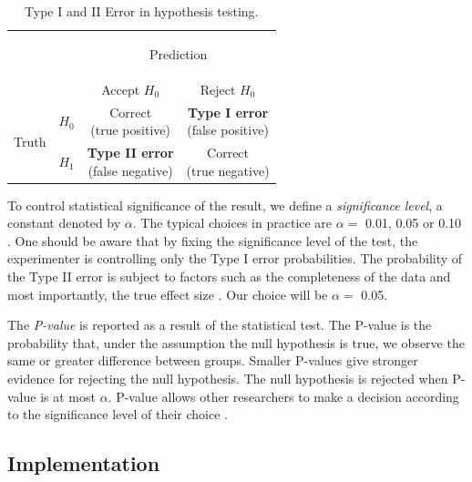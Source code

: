 \begin{table}[!htbp]
\centering
\renewcommand{\arraystretch}{2.5}
\begin{tabular}{l|l|c|c|}
\multicolumn{2}{c}{}&\multicolumn{2}{c}{\begin{large}Prediction \end{large}}\\
\cline{3-4}
\multicolumn{2}{c|}{}&Accept $H_{0}$&Reject $H_{0}$\\
\cline{2-4}
\multirow{2}{*}{\begin{large}Truth\end{large}}& \textbf{$H_{0}$} & \shortstack{Correct\\(true positive)} & \shortstack{\textbf{Type I error}\\(false positive)}\\
\cline{2-4}
& \textbf{$H_{1}$} & \shortstack{\textbf{Type II error}\\(false negative)} & \shortstack{Correct\\(true negative)} \\
\cline{2-4}
\end{tabular}
\caption{Type I and II Error in hypothesis testing.}
\label{tab:hypothesis_testing_errors}
\end{table}

To control statistical significance of the result, we define a \textit{significance level}, a constant denoted by $\alpha$. The typical choices in practice are $\alpha =$ 0.01, 0.05 or 0.10 \cite{casella}. One should be aware that by fixing the significance level of the test, the experimenter is controlling only the Type I error probabilities. The probability of the Type II error is subject to factors such as the completeness of the data and most importantly, the true effect size \cite{sham_purcell}. Our choice will be $\alpha =$ 0.05.

The \textit{P-value} is reported as a result of the statistical test. The P-value is the probability that, under the assumption the null hypothesis is true, we observe the same or greater difference between groups. Smaller P-values give stronger evidence for rejecting the null hypothesis. The null hypothesis is rejected when P-value is at most $\alpha$. P-value allows other researchers to make a decision according to the significance level of their choice \cite{pvalue, sham_purcell, lehmann}.

\subsection{Implementation}

